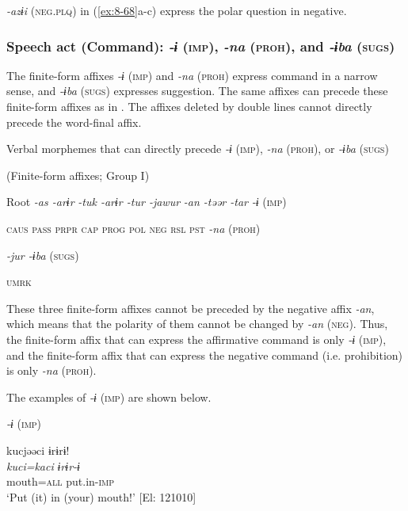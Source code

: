 \textit{-azɨi} (\textsc{neg}.\textsc{plq}) in (\ref{ex:8-68}a-c) express the polar question in negative.

\subsubsection{Speech act (Command): \textit{-ɨ} (\textsc{imp}), \textit{-na} (\textsc{proh}), and \textit{-ɨba} (\textsc{sugs})}

The finite-form affixes \textit{-ɨ} (\textsc{imp}) and \textit{-na} (\textsc{proh}) express command in a narrow sense, and \textit{-ɨba} (\textsc{sugs}) expresses suggestion. The same affixes can precede these finite-form affixes as in . The affixes deleted by double lines cannot directly precede the word-final affix.

\ea\label{ex:8-69}
  Verbal morphemes that can directly precede \textit{-ɨ} (\textsc{imp}), \textit{-na} (\textsc{proh}), or \textit{-ɨba} (\textsc{sugs})

(Finite-form affixes; Group I)

  Root  \textit{-as  -arɨr} %
\textit{-tuk  -arɨr  -tur  -jawur} %
\textit{-an  -təər  -tar} %
\textit{-ɨ} (\textsc{imp})

    \textsc{caus}  \textsc{pass}  \textsc{prpr}  \textsc{cap}  \textsc{prog}  \textsc{pol}  \textsc{neg}  \textsc{rsl}  \textsc{pst}    \textit{-na} (\textsc{proh})

          \textit{-jur      -ɨba} (\textsc{sugs})

          \textsc{umrk}
\z

These three finite-form affixes cannot be preceded by the negative affix \textit{-an}, which means that the polarity of them cannot be changed by \textit{-an} (\textsc{neg}). Thus, the finite-form affix that can express the affirmative command is only \textit{-ɨ} (\textsc{imp}), and the finite-form affix that can express the negative command (i.e. prohibition) is only \textit{-na} (\textsc{proh}).

  The examples of \textit{-ɨ} (\textsc{imp}) are shown below.

\ea\label{ex:8-70}
  \textit{-ɨ} (\textsc{imp})

\ea
{\TM}
\glll  kucjəəci  ɨrɨrɨ!\\
\textit{kuci=kaci}  \textit{ɨrɨr-ɨ}\\
mouth=\textsc{all}  put.in-\textsc{imp}\\
\glt ‘Put (it) in (your) mouth!’ [El: 121010]

